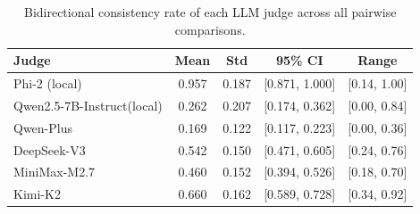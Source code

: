 \begin{table}[htbp]
\centering
\caption{Bidirectional consistency rate of each LLM judge across all pairwise comparisons.}
\label{tab:consistency}
\begin{tabular}{lcccc}
\hline
Judge & Mean & Std & 95\% CI & Range \\
\hline
Phi-2 (local) & 0.957 & 0.187 & [0.871, 1.000] & [0.14, 1.00] \\
Qwen2.5-7B-Instruct(local) & 0.262 & 0.207 & [0.174, 0.362] & [0.00, 0.84] \\
Qwen-Plus & 0.169 & 0.122 & [0.117, 0.223] & [0.00, 0.36] \\
DeepSeek-V3 & 0.542 & 0.150 & [0.471, 0.605] & [0.24, 0.76] \\
MiniMax-M2.7 & 0.460 & 0.152 & [0.394, 0.526] & [0.18, 0.70] \\
Kimi-K2 & 0.660 & 0.162 & [0.589, 0.728] & [0.34, 0.92] \\
\hline
\end{tabular}
\end{table}
